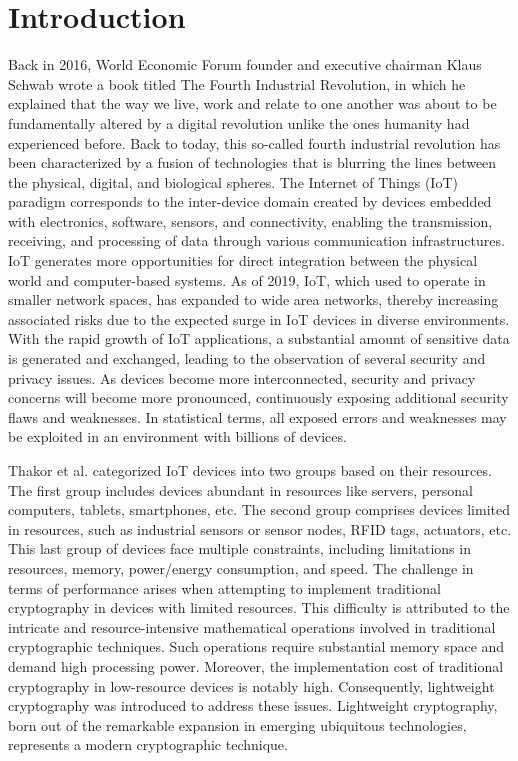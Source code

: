\documentclass[conference,compsoc]{IEEEtran}
\begin{document}
\section{Introduction}
Back in 2016, World Economic Forum founder and executive chairman Klaus Schwab wrote a book titled The Fourth Industrial Revolution, in which he explained that the way we live, work and relate to one another was about to be fundamentally altered by a digital revolution unlike the ones humanity had experienced before. Back to today, this so-called fourth industrial revolution has been characterized by a fusion of technologies that is blurring the lines between the physical, digital, and biological spheres\cite{WorldEconomicForum}.
The Internet of Things (IoT) paradigm corresponds to the inter-device domain created by devices embedded with electronics, software, sensors, and connectivity, enabling the transmission, receiving, and processing of data through various communication infrastructures. IoT generates more opportunities for direct integration between the physical world and computer-based systems.
As of 2019, IoT, which used to operate in smaller network spaces, has expanded to wide area networks, thereby increasing associated risks due to the expected surge in IoT devices in diverse environments. With the rapid growth of IoT applications, a substantial amount of sensitive data is generated and exchanged, leading to the observation of several security and privacy issues. As devices become more interconnected, security and privacy concerns will become more pronounced, continuously exposing additional security flaws and weaknesses. In statistical terms, all exposed errors and weaknesses may be exploited in an environment with billions of devices.

Thakor et al. categorized IoT devices into two groups based on their resources\cite{IoT_1}. The first group includes devices abundant in resources like servers, personal computers, tablets, smartphones, etc. The second group comprises devices limited in resources, such as industrial sensors or sensor nodes, RFID tags, actuators, etc.
This last group of devices face multiple constraints, including limitations in resources, memory, power/energy consumption, and speed. The challenge in terms of performance arises when attempting to implement traditional cryptography in devices with limited resources. This difficulty is attributed to the intricate and resource-intensive mathematical operations involved in traditional cryptographic techniques. Such operations require substantial memory space and demand high processing power. Moreover, the implementation cost of traditional cryptography in low-resource devices is notably high. Consequently, lightweight cryptography was introduced to address these issues. Lightweight cryptography, born out of the remarkable expansion in emerging ubiquitous technologies, represents a modern cryptographic technique.
\end{document}
